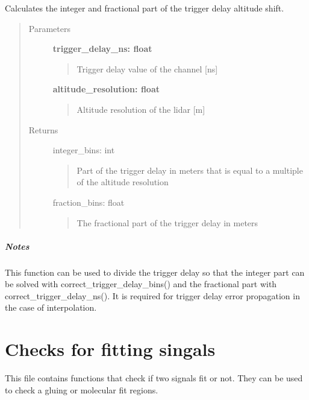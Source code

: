 \documentclass[letterpaper,10pt,english]{sphinxmanual}
\begin{document}
\begin{fulllineitems}
\label{pre_processing:pre_processing.trigger_delay_to_bins}
Calculates the integer and fractional part of the trigger delay altitude shift.
\begin{quote}\begin{description}
\item[{Parameters}] \leavevmode
\textbf{trigger\_delay\_ns: float}
\begin{quote}

Trigger delay value of the channel {[}ns{]}
\end{quote}

\textbf{altitude\_resolution: float}
\begin{quote}

Altitude resolution of the lidar {[}m{]}
\end{quote}

\item[{Returns}] \leavevmode
integer\_bins: int
\begin{quote}

Part of the trigger delay in meters that is equal to a multiple of
the altitude resolution
\end{quote}

fraction\_bins: float
\begin{quote}

The fractional part of the trigger delay in meters
\end{quote}

\end{description}\end{quote}
\paragraph{Notes}

This function can be used to divide the trigger delay so that the integer
part can be solved with correct\_trigger\_delay\_bins() and the fractional part
with correct\_trigger\_delay\_ns(). It is required for trigger delay error 
propagation in the case of interpolation.

\end{fulllineitems}



\chapter{Checks for fitting singals}
\label{fit_checks:checks-for-fitting-singals}\label{fit_checks::doc}\label{fit_checks:module-fit_checks}
This file contains functions that check if two signals fit or not. They can be used to check a
gluing or molecular fit regions.
\end{document}

